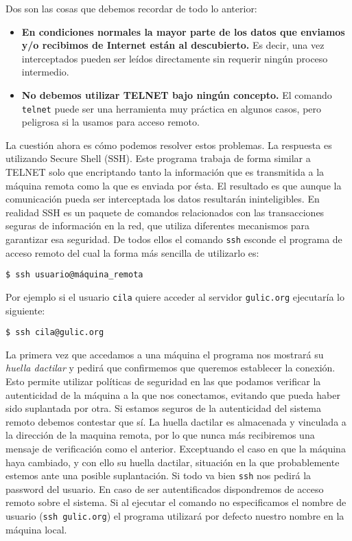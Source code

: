 Dos son las cosas que debemos recordar de todo lo anterior:

\begin{itemize}

\item {\bf  En condiciones normales  la mayor  parte de los  datos que
enviamos y/o  recibimos de Internet  están al descubierto.}  Es decir,
una  vez interceptados  pueden  ser leídos  directamente sin  requerir
ningún proceso intermedio.

\item  {\bf  No debemos  utilizar  TELNET  bajo ningún  concepto.}  El
comando {\tt telnet} puede ser una herramienta muy práctica en algunos
casos, pero peligrosa si la usamos para acceso remoto.

\end{itemize}

La  cuestión  ahora  es  cómo podemos  resolver  estos  problemas.  La
respuesta  es  utilizando  {\sf Secure  Shell  (SSH)}. Este
programa trabaja de forma similar  a TELNET solo que encriptando tanto
la información que  es transmitida a la máquina remota  como la que es
enviada por ésta. El resultado es que aunque la comunicación pueda ser
interceptada los  datos resultarán ininteligibles. En  realidad SSH es
un  paquete de  comandos  relacionados con  las transacciones  seguras
de  información en  la  red, que  utiliza  diferentes mecanismos  para
garantizar esa seguridad. De todos  ellos el comando {\tt ssh} esconde
el  programa de  acceso  remoto  del cual  la  forma  más sencilla  de
utilizarlo es:

\begin{verbatim} 
$ ssh usuario@máquina_remota 
\end{verbatim}

Por  ejemplo si el  usuario {\tt cila} quiere  acceder al servidor
{\tt gulic.org} ejecutaría lo siguiente: 

\begin{verbatim} 
$ ssh cila@gulic.org
\end{verbatim}

La primera vez que accedamos a una máquina el programa nos mostrará su
{\em huella dactilar} y pedirá que confirmemos que queremos establecer
la conexión. Esto  permite utilizar políticas de seguridad  en las que
podamos  verificar  la  autenticidad  de  la  máquina  a  la  que  nos
conectamos,  evitando  que  pueda  haber  sido  suplantada  por  otra.
Si  estamos seguros  de  la autenticidad  del  sistema remoto  debemos
contestar que  sí. La huella dactilar  es almacenada y vinculada  a la
dirección de la  maquina remota, por lo que nunca  más recibiremos una
mensaje de verificación  como el anterior. Exceptuando el  caso en que
la máquina haya cambiado, y con  ello su huella dactilar, situación en
la que probablemente estemos ante una posible suplantación. Si todo va
bien {\tt  ssh} nos  pedirá la  password del usuario.  En caso  de ser
autentificados dispondremos de  acceso remoto sobre el  sistema. Si al
ejecutar el  comando no especificamos  el nombre de usuario  ({\tt ssh
gulic.org}) el  programa utilizará por defecto  nuestro nombre
en la máquina local.

